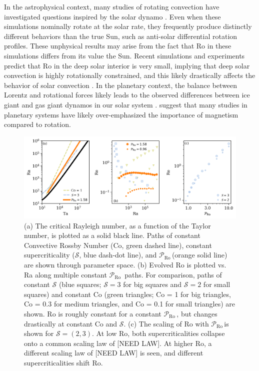 \documentclass[twocolumn, amsmath, amsfonts, amssymb]{aastex62}
\newcommand{\pro}{\ensuremath{\mathcal{P}_{\text{Ro}}\,}}
\begin{document}
In the astrophysical context,
many studies of rotating convection have investigated questions inspired by the solar dynamo
\citep{glatzmaier&gilman1982, busse2002, brown&all2008,
brown&all2010, brown&all2011, augustson&all2012, guerrero&all2013, kapyla&all2014}.
Even when these simulations nominally rotate at the solar rate,
they frequently produce distinctly different behaviors than the true Sun,
such as anti-solar differential rotation profiles.
These unphysical results may arise from the fact that Ro in these simulations differs from
its value the Sun. Recent simulations and experiments predict
that Ro in the deep solar interior is very small, implying that deep solar convection
is highly rotationally constrained, and this likely drastically
affects the behavior of solar convection
\citep{featherstone&hindman2016, greer&all2016}.
In the planetary context, the balance between Lorentz
and rotational forces likely leads to the observed differences between ice
giant and gas giant dynamos in our solar system \citep{soderlund&all2015}.
\cite{aurnou&king2017} suggest that many studies in planetary systems
have likely over-emphasized the importance of magnetism compared to rotation.

\begin{figure}[t!]
    \includegraphics[width=\textwidth]{parameter_space.png}
    \caption{(a) The critical Rayleigh number, as a function of the Taylor number, 
    is plotted as a solid black line. Paths of constant Convective Rossby Number
    (Co, green dashed line), constant supercriticality ($\mathcal{S}$, blue dash-dot line), and 
    \pro (orange solid line) are shown through parameter space. (b) Evolved
    Ro is plotted vs. Ra along multiple constant \pro
    paths. For comparison, paths of constant $\mathcal{S}$ (blue squares; $\mathcal{S} = 3$ for
    big squares and $\mathcal{S} = 2$ for small squares)
    and constant Co (green triangles; Co = 1 for big triangles, Co = 0.3 for medium triangles,
    and Co = 0.1 for small triangles) are shown.
    Ro is roughly constant for a constant \pro, but changes drastically at constant Co and 
    $\mathcal{S}$.
    (c) The scaling of Ro with \pro is shown for $\mathcal{S} = (2,3)$.
    At low Ro, both supercriticalities collapse onto a common scaling law of [NEED LAW].
    At higher Ro, a different scaling law of [NEED LAW] is seen, and different supercriticalities
    shift Ro.
    \label{fig:parameter_space} }
\end{figure}
\end{document}
